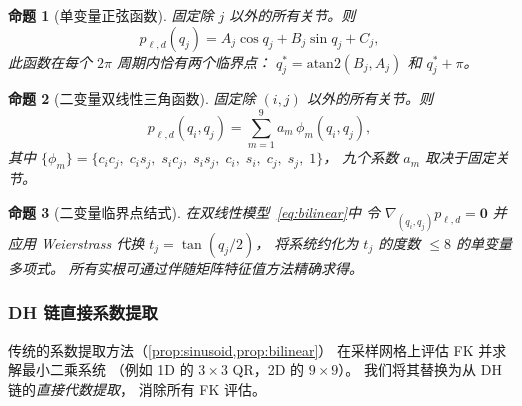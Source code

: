 \documentclass[journal]{IEEEtran}
\newtheorem{proposition}{命题}
\begin{document}
\begin{proposition}[单变量正弦函数]\label{prop:sinusoid}
固定除 $j$ 以外的所有关节。则
\begin{equation}\label{eq:sin_form}
  p_{\ell,d}(q_j)
  = A_j\cos q_j + B_j\sin q_j + C_j,
\end{equation}
此函数在每个 $2\pi$ 周期内恰有\emph{两个}临界点：
$q_j^* = \mathrm{atan2}(B_j,A_j)$ 和 $q_j^* + \pi$。
\end{proposition}

\begin{proposition}[二变量双线性三角函数]\label{prop:bilinear}
固定除 $(i,j)$ 以外的所有关节。则
\begin{equation}\label{eq:bilinear}
  p_{\ell,d}(q_i,q_j) = \sum_{m=1}^{9} a_m\,\phi_m(q_i,q_j),
\end{equation}
其中 $\{\phi_m\} = \{c_i c_j,\; c_i s_j,\; s_i c_j,\; s_i s_j,\;
c_i,\; s_i,\; c_j,\; s_j,\; 1\}$，
九个系数 $a_m$ 取决于固定关节。
\end{proposition}

\begin{proposition}[二变量临界点结式]\label{prop:resultant}
在双线性模型~\eqref{eq:bilinear}中
令 $\nabla_{(q_i,q_j)} p_{\ell,d} = \bm{0}$
并应用 Weierstrass 代换 $t_j = \tan(q_j/2)$，
将系统约化为 $t_j$ 的度数 $\leq 8$ 的单变量多项式。
所有实根可通过伴随矩阵特征值方法精确求得。
\end{proposition}


\subsubsection{DH 链直接系数提取}\label{sec:dh_coeff}


传统的系数提取方法（\cref{prop:sinusoid,prop:bilinear}）
在采样网格上评估 FK 并求解最小二乘系统
（例如 1D 的 $3{\times}3$ QR，2D 的 $9{\times}9$）。
我们将其替换为从 DH 链的\emph{直接代数提取}，
消除所有 FK 评估。
\end{document}
